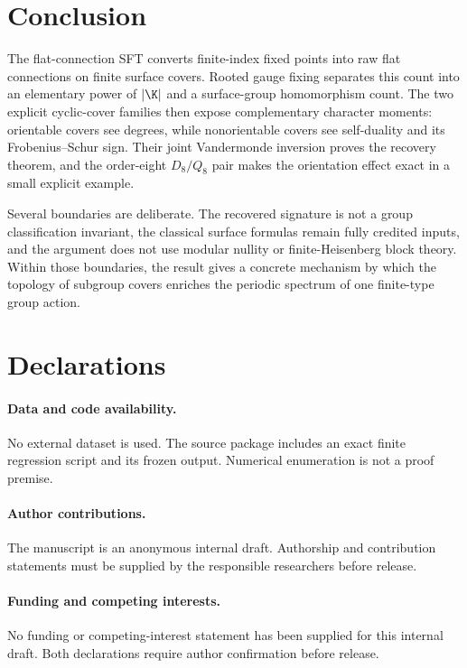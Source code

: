\section{Conclusion}
\label{sec:conclusion}

The flat-connection SFT converts finite-index fixed points into raw flat
connections on finite surface covers.  Rooted gauge fixing separates this
count into an elementary power of $|\K|$ and a surface-group homomorphism
count.  The two explicit cyclic-cover families then expose complementary
character moments: orientable covers see degrees, while nonorientable covers
see self-duality and its Frobenius--Schur sign.  Their joint Vandermonde
inversion proves the recovery theorem, and the order-eight $D_8/Q_8$ pair
makes the orientation effect exact in a small explicit example.

Several boundaries are deliberate.  The recovered signature is not a group
classification invariant, the classical surface formulas remain fully
credited inputs, and the argument does not use modular nullity or
finite-Heisenberg block theory.  Within those boundaries, the result gives a
concrete mechanism by which the topology of subgroup covers enriches the
periodic spectrum of one finite-type group action.

\section*{Declarations}

\paragraph{Data and code availability.}
No external dataset is used.  The source package includes an exact finite
regression script and its frozen output.  Numerical enumeration is not a proof
premise.

\paragraph{Author contributions.}
The manuscript is an anonymous internal draft.  Authorship and contribution
statements must be supplied by the responsible researchers before release.

\paragraph{Funding and competing interests.}
No funding or competing-interest statement has been supplied for this
internal draft.  Both declarations require author confirmation before
release.


